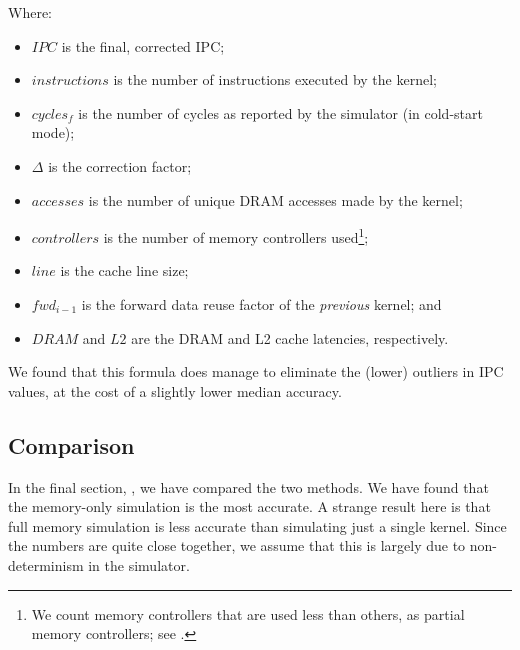 Where:
\begin{itemize}
    \item $IPC$ is the final, corrected IPC;
    \item $instructions$ is the number of instructions executed by the kernel;
    \item $cycles_f$ is the number of cycles as reported by the simulator (in cold-start mode);
    \item $\Delta$ is the correction factor;
    \item $accesses$ is the number of unique DRAM accesses made by the kernel;
    \item $controllers$ is the number of memory controllers used\footnote{We count memory controllers that are used less than others, as partial memory controllers; see .};
    \item $line$ is the cache line size;
    \item $fwd_{i-1}$ is the forward data reuse factor of the \textit{previous} kernel; and
    \item $DRAM$ and $L2$ are the DRAM and L2 cache latencies, respectively.
\end{itemize}

We found that this formula does manage to eliminate the (lower) outliers in IPC values, at the cost of a slightly lower median accuracy.

\subsection{Comparison}\label{subsec:comparison}
In the final section, , we have compared the two methods.
We have found that the memory-only simulation is the most accurate.
A strange result here is that full memory simulation is less accurate than simulating just a single kernel.
Since the numbers are quite close together, we assume that this is largely due to non-determinism in the simulator.
